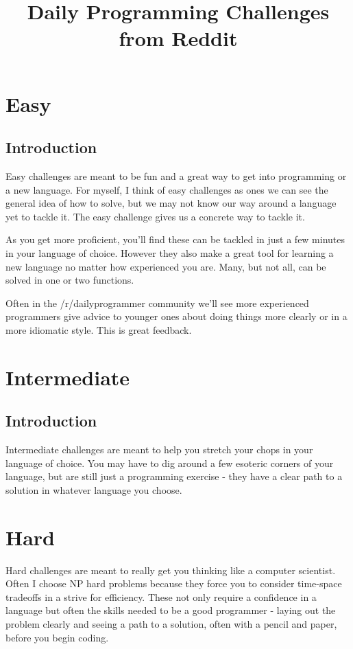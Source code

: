\documentclass{book}
\title{Daily Programming Challenges from Reddit}
\begin{document}
    
\maketitle

\tableofcontents

\chapter{Easy}

\section*{Introduction}

Easy challenges are meant to be fun and a great way to get into programming or a new language. For myself, I think of easy challenges as ones we can see the general idea of how to solve, but we may not know our way around a language yet to tackle it. The easy challenge gives us a concrete way to tackle it. 

As you get more proficient, you'll find these can be tackled in just a few minutes in your language of choice. However they also make a great tool for learning a new language no matter how experienced you are. Many, but not all, can be solved in one or two functions. 

Often in the /r/dailyprogrammer community we'll see more experienced programmers give advice to younger ones about doing things more clearly or in a more idiomatic style. This is great feedback.



\chapter{Intermediate}

\section*{Introduction}

Intermediate challenges are meant to help you stretch your chops in your language of choice. You may have to dig around a few esoteric corners of your language, but are still just a programming exercise - they have a clear path to a solution in whatever language you choose. 



\chapter{Hard}

Hard challenges are meant to really get you thinking like a computer scientist. Often I choose NP hard problems because they force you to consider time-space tradeoffs in a strive for efficiency. These not only require a confidence in a language but often the skills needed to be a good programmer - laying out the problem clearly and seeing a path to a solution, often with a pencil and paper, before you begin coding. 



\printindex
\end{document}
